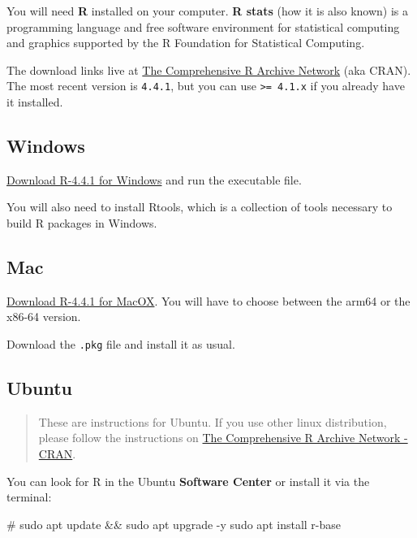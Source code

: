 \documentclass[
  letterpaper,
  DIV=11,
  numbers=noendperiod]{scrreprt}
\newenvironment{Shaded}{\begin{snugshade}}{\end{snugshade}}
\newcommand{\CommentTok}[1]{\textcolor[rgb]{0.37,0.37,0.37}{#1}}
\newcommand{\FunctionTok}[1]{\textcolor[rgb]{0.28,0.35,0.67}{#1}}
\newcommand{\NormalTok}[1]{\textcolor[rgb]{0.00,0.23,0.31}{#1}}
\begin{document}
You will need \textbf{R} installed on your computer. \textbf{R stats}
(how it is also known) is a programming language and free software
environment for statistical computing and graphics supported by the R
Foundation for Statistical Computing.

The download links live at \href{https://cran.r-project.org/}{The
Comprehensive R Archive Network} (aka CRAN). The most recent version is
\texttt{4.4.1}, but you can use \texttt{\textgreater{}=\ 4.1.x} if you
already have it installed.

\subsection{Windows}

\href{https://cran.r-project.org/bin/windows/base/R-4.4.1-win.exe}{Download
R-4.4.1 for Windows} and run the executable file.

You will also need to install Rtools, which is a collection of tools
necessary to build R packages in Windows.

\subsection{Mac}

\href{https://cran.r-project.org/}{Download R-4.4.1 for MacOX}. You will
have to choose between the arm64 or the x86-64 version.

Download the \texttt{.pkg} file and install it as usual.

\subsection{Ubuntu}

\begin{quote}
These are instructions for Ubuntu. If you use other linux distribution,
please follow the instructions on
\href{https://cran.r-project.org/bin/linux/}{The Comprehensive R Archive
Network - CRAN}.
\end{quote}

You can look for R in the Ubuntu \textbf{Software Center} or install it
via the terminal:

\begin{Shaded}
\begin{Highlighting}[]
\CommentTok{\# sudo apt update \&\& sudo apt upgrade {-}y}
\FunctionTok{sudo}\NormalTok{ apt install r{-}base}
\end{Highlighting}
\end{Shaded}
\end{document}
